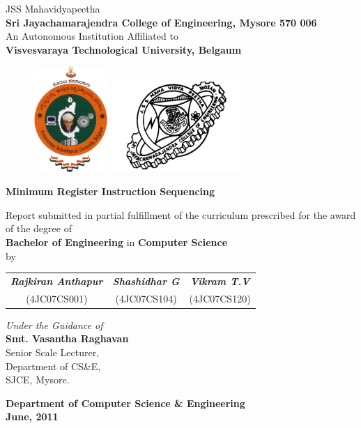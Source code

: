 \documentclass[12pt]{report}
\begin{document}
\pagestyle{empty}
\begin{center}\large JSS Mahavidyapeetha\\\textbf{Sri Jayachamarajendra College of Engineering, Mysore 570 006}\\
An Autonomous Institution Affiliated to\\
\textbf{Visvesvaraya Technological University, Belgaum}\\
\vspace{0.2cm}
\end{center}
\begin{figure}[h]
\centering
\includegraphics[height=4cm]{vtu.png}
\hspace{0.4\textwidth}
\includegraphics[height=3.7cm]{jcelogo.jpg}
\end{figure}
\begin{center}
\vspace{0.2cm}
\Huge{\textbf{Minimum Register Instruction Sequencing}}
\vspace{2cm}

\large Report submitted in partial fulfillment of the curriculum prescribed for the award of the degree of \\
\vspace{1cm}
\large\textbf{ Bachelor of Engineering} in {\bf Computer Science}\\ by
\vspace{1cm}

\begin{tabular}{ccc}
\emph{\textbf{Rajkiran Anthapur}} & \emph{\textbf{Shashidhar G}} & \emph{\textbf{Vikram T.V}}\tabularnewline
(4JC07CS001) & (4JC07CS104) & (4JC07CS120)
\end{tabular}
\vspace{1.7cm}

\emph{Under the Guidance of}\\
\textbf{Smt. Vasantha Raghavan}\\
Senior Scale Lecturer,\\
Department of CS\&E,\\
SJCE, Mysore.
\vspace{0.5cm}

\textbf{Department of Computer Science \& Engineering}\\
\textbf{June, 2011}\\
\end{center}
\newpage
\end{document}
